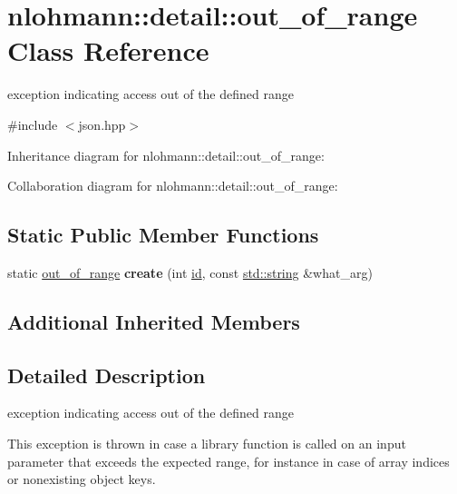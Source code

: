 \hypertarget{classnlohmann_1_1detail_1_1out__of__range}{}\section{nlohmann\+:\+:detail\+:\+:out\+\_\+of\+\_\+range Class Reference}
\label{classnlohmann_1_1detail_1_1out__of__range}


exception indicating access out of the defined range  




{\ttfamily \#include $<$json.\+hpp$>$}



Inheritance diagram for nlohmann\+:\+:detail\+:\+:out\+\_\+of\+\_\+range\+:


Collaboration diagram for nlohmann\+:\+:detail\+:\+:out\+\_\+of\+\_\+range\+:
\subsection*{Static Public Member Functions}
\begin{DoxyCompactItemize}
\item 
static \hyperlink{classnlohmann_1_1detail_1_1out__of__range}{out\+\_\+of\+\_\+range} {\bfseries create} (int \hyperlink{classnlohmann_1_1detail_1_1exception_a0d4589a3fb54e81646d986c05efa3b9a}{id}, const \hyperlink{namespacenlohmann_1_1detail_a90aa5ef615aa8305e9ea20d8a947980fab45cffe084dd3d20d928bee85e7b0f21}{std\+::string} \&what\+\_\+arg)\hypertarget{classnlohmann_1_1detail_1_1out__of__range_a661c8a3af0caeb2621bfb7ae3a02c66b}{}\label{classnlohmann_1_1detail_1_1out__of__range_a661c8a3af0caeb2621bfb7ae3a02c66b}

\end{DoxyCompactItemize}
\subsection*{Additional Inherited Members}


\subsection{Detailed Description}
exception indicating access out of the defined range 

This exception is thrown in case a library function is called on an input parameter that exceeds the expected range, for instance in case of array indices or nonexisting object keys.

